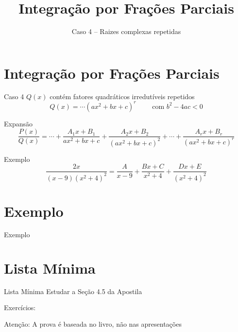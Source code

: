 
\usepackage{integracao_e_series}
\usepackage{systeme}

\title{Integração por Frações Parciais}
\subtitle{Caso 4 -- Raizes complexas repetidas}



\addtitle

\section{Integração por Frações Parciais}

\begin{frame}{Caso 4}
  $Q(x)$ contém fatores quadráticos irredutíveis repetidos
  \[
    Q(x) = \cdots  \left( ax^2 + bx + c \right)^r
    \qquad
    \text{ com } b^2-4ac<0
  \]

  \pause
  Expansão
  \[
    \frac{P(x)}{Q(x)}
    = \cdots
    + \frac{A_1x+B_1}{ax^2+bx+c}
    + \frac{A_2x+B_2}{(ax^2+bx+c)^2}
    + \cdots
    + \frac{A_rx+B_r}{(ax^2+bx+c)^r}
  \]
\end{frame}

\begin{frame}{Exemplo}
\[
  \frac{2x}{(x-9)(x^2+4)^2}
  = \frac{A}{x-9}
  + \frac{Bx+C}{x^2+4}
  + \frac{Dx+E}{(x^2+4)^2}
\]
\end{frame}

\addtocounter{exemplo}{1}
\section{Exemplo \theexemplo}

\begin{frame}{Exemplo \theexemplo}
\end{frame}

\section{Lista Mínima}

\begin{frame}{Lista Mínima}
  Estudar a Seção 4.5 da Apostila

  Exercícios:

  \vfill
  Atenção: A prova é baseada no livro, não nas apresentações
\end{frame}


